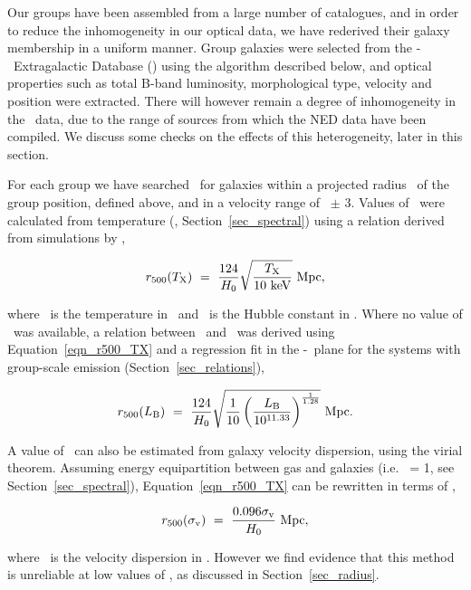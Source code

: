 \documentclass[usenatbib]{mn2e}
\begin{document}
Our groups have been assembled from a large number of catalogues, and in
order to reduce the inhomogeneity in our optical data, we have rederived their
galaxy membership in a uniform manner.  Group galaxies were selected from the
\NASA-\IPAC\ Extragalactic Database (\NED) using the algorithm described below,
and optical properties such as total B-band luminosity, morphological type,
velocity and position were extracted.  There will however remain a degree of
inhomogeneity in the \NED\ data, due to the range of sources from which 
the NED data have been compiled. We discuss some checks on the
effects of this heterogeneity, later in this section.

For each group we have searched \NED\ for galaxies within a projected radius
\rfh\ of the group position, defined above, and in a velocity range of \vel\
$\pm$ 3\sigmav.  Values of \rfh\ were calculated from temperature
(\TX, Section~\ref{sec_spectral}) using a relation derived from simulations by
\citet*{evrard96},

\begin{equation}
r_{\mathrm{500}}(T_{\mathrm{X}}) ~ = ~ \frac{124}{H_{\mathrm{0}}} \sqrt{\frac{T_{\mathrm{X}}}{10~\mbox{keV}}} ~ \mbox{Mpc},
\label{eqn_r500_TX}
\end{equation}

\noindent where \TX\ is the temperature in \kev\ and \Hzero\ is the Hubble
constant in \kmpspMpc.  Where no value of \TX\ was available, a relation
between \rfh\ and \LB\ was derived using Equation~\ref{eqn_r500_TX} and a
regression fit in the \LB-\TX\ plane for the systems with group-scale emission
(Section~\ref{sec_relations}),

\begin{equation}
r_{\mathrm{500}}(L_{\mathrm{B}}) ~ = ~ \frac{124}{H_{\mathrm{0}}} \sqrt{\frac{1}{10}\left(\frac{L_{\mathrm{B}}}{10^{11.33}}\right)^{\frac{1}{1.28}}} ~ \mbox{Mpc}.
\label{eqn_r500_LB}
\end{equation}

\noindent A value of \rfh\ can also be estimated from galaxy velocity dispersion,
using the virial theorem.  Assuming energy equipartition between gas and galaxies
(i.e. \betaspec\ = 1, see Section~\ref{sec_spectral}), Equation~\ref{eqn_r500_TX}
can be rewritten in terms of \sigmav,

\begin{equation}
r_{\mathrm{500}}(\sigma_{\mathrm{v}}) ~ = ~ \frac{0.096\sigma_{\mathrm{v}}}{H_{\mathrm{0}}} ~ \mbox{Mpc},
\label{eqn_r500_sig}
\end{equation}

\noindent where \sigmav\ is the velocity dispersion in \kmps.  However we find
evidence that this method is unreliable at low values of \sigmav, as discussed in
Section~\ref{sec_radius}.
\end{document}
